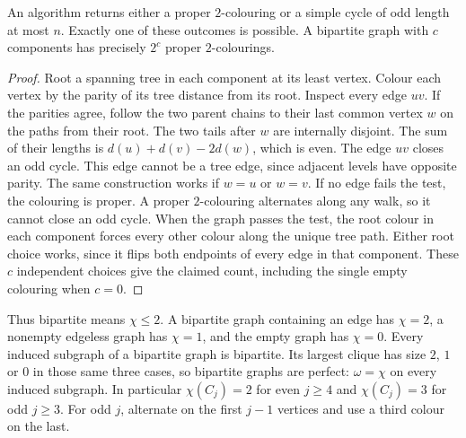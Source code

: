 \begin{theorem}\leavevmode\label{co:bip}
An algorithm returns either a proper $2$-colouring or a simple cycle of
odd length at most $n$. Exactly one of these outcomes is possible.
A bipartite graph with $c$ components has precisely $2^c$ proper
$2$-colourings.
\end{theorem}
\begin{proof}
Root a spanning tree in each component at its least vertex. Colour each
vertex by the parity of its tree distance from its root. Inspect every edge
$uv$. If the parities agree, follow the two parent chains to their last
common vertex $w$ on the paths from their root. The two tails after $w$ are
internally disjoint. The sum of their lengths is
$d(u)+d(v)-2d(w)$, which is even. The edge $uv$ closes an odd cycle.
This edge cannot be a tree edge, since adjacent levels have opposite parity.
The same construction works if $w=u$ or $w=v$. If no edge fails the test,
the colouring is proper. A proper $2$-colouring alternates along any walk,
so it cannot close an odd cycle. When the graph passes the test, the root
colour in each component forces every other colour along the unique tree
path. Either root choice works, since it flips both endpoints of every edge
in that component. These $c$ independent choices give the claimed count,
including the single empty colouring when $c=0$.
\end{proof}
Thus bipartite means $\chi\le 2$. A bipartite graph containing an edge
has $\chi=2$, a nonempty edgeless graph has $\chi=1$, and the empty graph
has $\chi=0$. Every induced subgraph of a bipartite graph is bipartite.
Its largest clique has size $2$, $1$ or $0$ in those same three cases,
so bipartite graphs are perfect: $\omega=\chi$ on every induced subgraph.
In particular $\chi(C_j)=2$ for even $j\ge 4$ and $\chi(C_j)=3$ for odd
$j\ge3$. For odd $j$, alternate on the first $j-1$ vertices and use a third
colour on the last.

